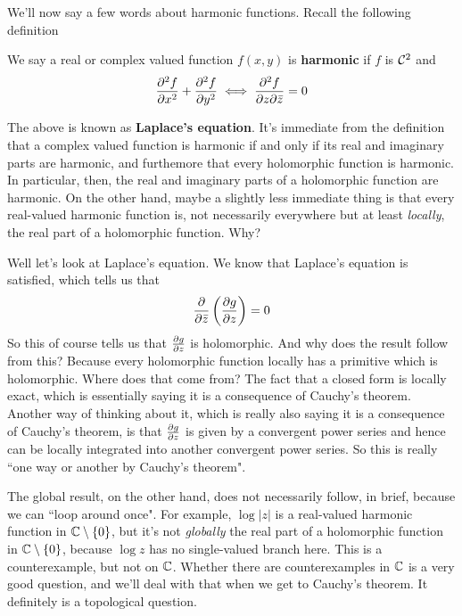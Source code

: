 \documentclass{article}
\begin{document}
We'll now say a few words about harmonic functions. Recall the following definition
\begin{definition}[Harmonic]
We say a real or complex valued function \(f(x, y)\) is \textbf{harmonic} if \(f\) is \(\mathcal{C}^2\) and
\begin{equation}{\frac{\partial {^2f}}{\partial {x^2}}} + {\frac{\partial {^2f}}{\partial {y^2}}} \iff {\frac{\partial {^2f}}{\partial {z\partial\bar{z}}}} = 0\end{equation}
\end{definition}
The above is known as \textbf{Laplace's equation}. It's immediate from the definition that a complex valued function is harmonic if and only if its real and imaginary parts are harmonic, and furthemore that every holomorphic function is harmonic. In particular, then, the real and imaginary parts of a holomorphic function are harmonic. On the other hand, maybe a slightly less immediate thing is that every real-valued harmonic function is, not necessarily everywhere but at least \textit{locally}, the real part of a holomorphic function. Why?

Well let's look at Laplace's equation. We know that Laplace's equation is satisfied, which tells us that
\begin{equation}{\frac{\partial {}}{\partial {\bar{z}}}}\left({\frac{\partial {g}}{\partial {z}}}\right) = 0\end{equation}
So this of course tells us that \({\frac{\partial {g}}{\partial {z}}}\) is holomorphic. And why does the result follow from this? Because every holomorphic function locally has a primitive which is holomorphic. Where does that come from? The fact that a closed form is locally exact, which is essentially saying it is a consequence of Cauchy's theorem. Another way of thinking about it, which is really also saying it is a consequence of Cauchy's theorem, is that \({\frac{\partial {g}}{\partial {z}}}\) is given by a convergent power series and hence can be locally integrated into another convergent power series. So this is really ``one way or another by Cauchy's theorem".

The global result, on the other hand, does not necessarily follow, in brief, because we can ``loop around once". For example, \(\log|z|\) is a real-valued harmonic function in \(\mathbb{C} \setminus \{0\}\), but it's not \textit{globally} the real part of a holomorphic function in \(\mathbb{C} \setminus \{0\}\), because \(\log z\) has no single-valued branch here. This is a counterexample, but not on \(\mathbb{C}\). Whether there are counterexamples in \(\mathbb{C}\) is a very good question, and we'll deal with that when we get to Cauchy's theorem. It definitely is a topological question.
\end{document}
